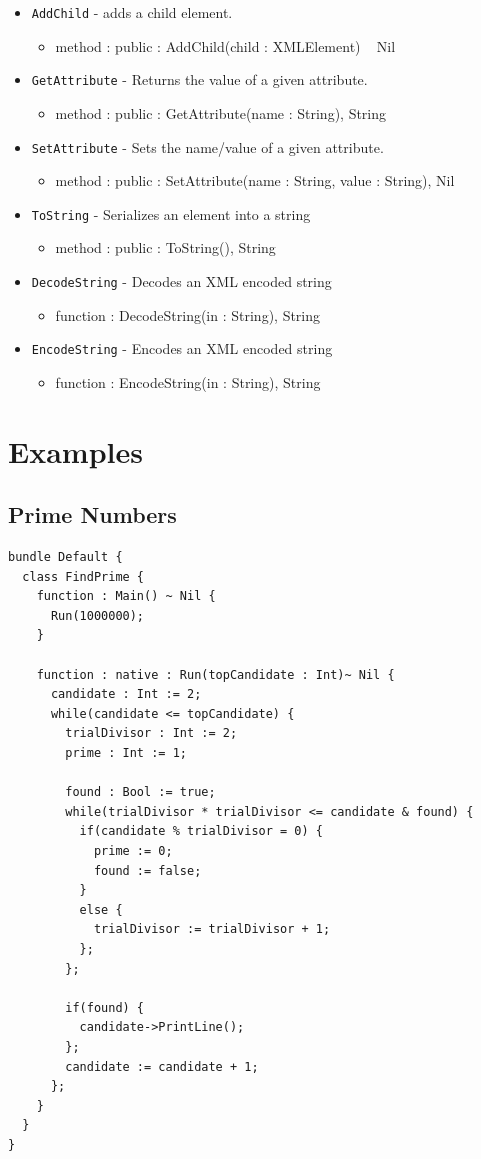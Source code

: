 \documentclass[12pt]{article}
\begin{document}
\begin{itemize}
\item \texttt{AddChild} - adds a child element.
  \begin{itemize}
  \item method : public : AddChild(child : XMLElement) ~ Nil
  \end{itemize}
\item \texttt{GetAttribute} - Returns the value of a given attribute.
  \begin{itemize}
  \item method : public : GetAttribute(name : String), String
  \end{itemize}
\item \texttt{SetAttribute} - Sets the name/value of a given attribute.
  \begin{itemize}
  \item method : public : SetAttribute(name : String, value : String), Nil
  \end{itemize}
\item \texttt{ToString} - Serializes an element into a string
  \begin{itemize}
  \item method : public : ToString(), String
  \end{itemize}
\item \texttt{DecodeString} - Decodes an XML encoded string
  \begin{itemize}
  \item function : DecodeString(in : String), String
  \end{itemize}
\item \texttt{EncodeString} - Encodes an XML encoded string
  \begin{itemize}
  \item function : EncodeString(in : String), String
  \end{itemize}
\end{itemize}

\section{Examples}
\subsection{Prime Numbers}
\begin{verbatim}
bundle Default {
  class FindPrime {
    function : Main() ~ Nil {
      Run(1000000);
    }

    function : native : Run(topCandidate : Int)~ Nil {
      candidate : Int := 2;
      while(candidate <= topCandidate) {
        trialDivisor : Int := 2;
        prime : Int := 1;

        found : Bool := true;
        while(trialDivisor * trialDivisor <= candidate & found) {
          if(candidate % trialDivisor = 0) {
            prime := 0;
            found := false;
          }
          else {
            trialDivisor := trialDivisor + 1;
          };
        };

        if(found) {
          candidate->PrintLine();
        };
        candidate := candidate + 1;
      };
    }
  }
}
\end{verbatim}
\end{document}
